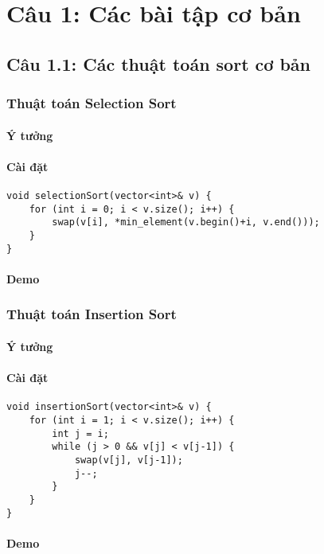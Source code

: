 \chapter{Câu 1: Các bài tập cơ bản}

\section{Câu 1.1: Các thuật toán sort cơ bản}

\subsection{Thuật toán Selection Sort}
\subsubsection{Ý tưởng}
\subsubsection{Cài đặt}
\begin{verbatim}
void selectionSort(vector<int>& v) {
    for (int i = 0; i < v.size(); i++) {
        swap(v[i], *min_element(v.begin()+i, v.end()));
    }
}
\end{verbatim}
\subsubsection{Demo}

\subsection{Thuật toán Insertion Sort}
\subsubsection{Ý tưởng}
\subsubsection{Cài đặt}
\begin{verbatim}
void insertionSort(vector<int>& v) {
    for (int i = 1; i < v.size(); i++) {
        int j = i;
        while (j > 0 && v[j] < v[j-1]) {
            swap(v[j], v[j-1]);
            j--;
        }
    }
}
\end{verbatim}
\subsubsection{Demo}

